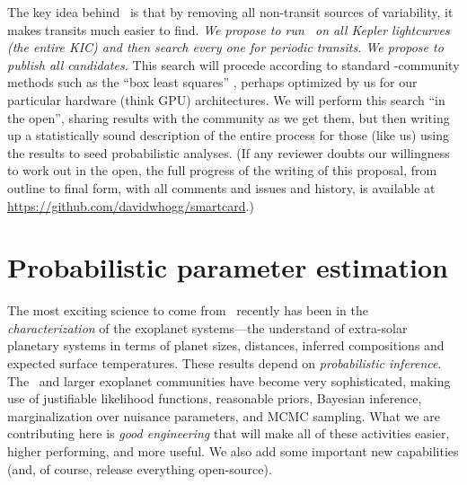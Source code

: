 \documentclass[letterpaper,12pt,preprint]{hack_aastex}
\newcommand{\Untrendy}{\package{Untrendy}}
\begin{document}
The key idea behind \Untrendy\ is that by removing all non-transit
sources of variability, it makes transits much easier to find.
\emph{We propose to run \Untrendy\ on all Kepler lightcurves (the
  entire KIC) and then search every one for periodic transits.  We
  propose to publish all candidates.}
This search will procede
according to standard \Kepler-community methods such as the ``box
least squares'' \citep{box}, perhaps optimized by us for our particular
hardware (think GPU) architectures.
We will perform this search ``in
the open'', sharing results with the community as we get them, but
then writing up a statistically sound description of the entire
process for those (like us) using the results to seed probabilistic
analyses.
(If any reviewer doubts our willingness to work out in the open, the
full progress of the writing of this proposal, from outline to final
form, with all comments and issues and history, is available at
\url{https://github.com/davidwhogg/smartcard}.)


\section{Probabilistic parameter estimation}

The most exciting science to come from \Kepler\ recently has been in
the \emph{characterization} of the exoplanet systems---the understand
of extra-solar planetary systems in terms of planet sizes, distances,
inferred compositions and expected surface temperatures.  These
results depend on \emph{probabilistic inference}.  The \Kepler\ and
larger exoplanet communities have become very sophisticated, making
use of justifiable likelihood functions, reasonable priors, Bayesian
inference, marginalization over nuisance parameters, and MCMC
sampling.  What we are contributing here is \emph{good engineering}
that will make all of these activities easier, higher performing, and
more useful.  We also add some important new capabilities (and, of course, release everything open-source).
\end{document}
